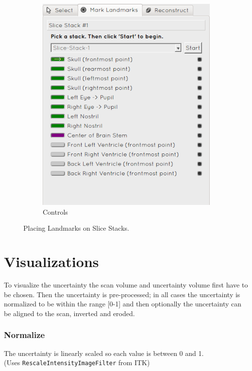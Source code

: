 \begin{figure}[H]
\begin{subfigure}[b]{0.441\textwidth}
    \includegraphics[width=\textwidth]{images/reconstruction/controls.png}
    \caption*{Controls}
    \label{fig:reconstructioncontrols}
  \end{subfigure}
  \caption{Placing Landmarks on Slice Stacks.}\label{fig:reconstructionlandmarks}
\end{figure}


\clearpage
\section{Visualizations}\label{implementation:visualizations}
To visualize the uncertainty the scan volume and uncertainty volume first have to be chosen. Then the uncertainty is pre-processed; in all cases the uncertainty is normalized to be within the range [0-1] and then optionally the uncertainty can be aligned to the scan, inverted and eroded.

\subsubsection*{Normalize}
The uncertainty is linearly scaled so each value is between 0 and 1.\\(Uses \texttt{RescaleIntensityImageFilter} from ITK)

